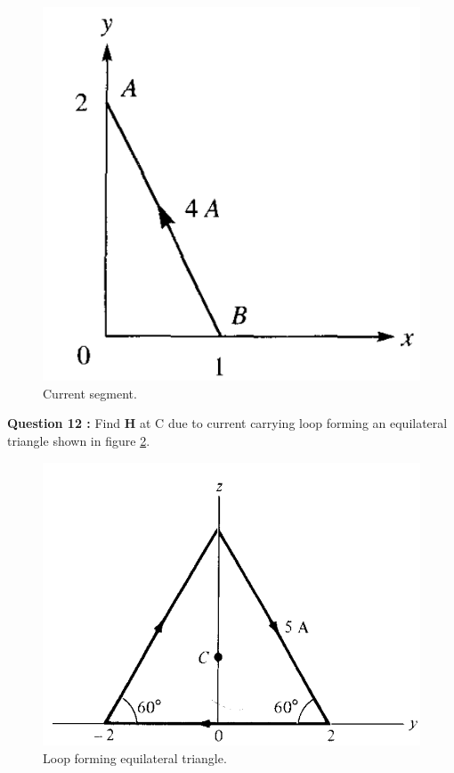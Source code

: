 \documentclass[12pt,a4paper]{article}
\begin{document}
\begin{figure}[H]
\centering
\includegraphics[scale=0.45]{Figure7-27S.png}
\caption{Current segment.}
\label{AB-segment2}
\end{figure}
\noindent\textbf{Question 12 \cite[Problem 7.8, page 298]{Sadiku}:} Find \textbf{H} at C due to current carrying loop forming an equilateral triangle shown in figure \ref{equilateral-wires}.\\
\begin{figure}[H]
\centering
\includegraphics[scale=0.4]{Figure7-29S.png}
\caption{Loop forming equilateral triangle.}
\label{equilateral-wires}
\end{figure}
\end{document}
